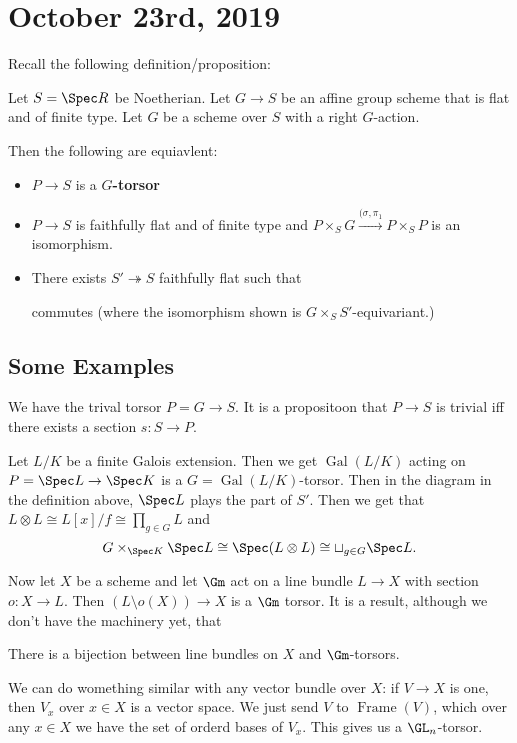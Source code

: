 \documentclass[12pt]{article}
\begin{document}
\section{October 23rd, 2019}
Recall the following definition/proposition:
\begin{defn}
	Let $S=\Spec R$ be Noetherian. Let $G\to S$ be an affine group scheme that is flat and of finite type. Let $G$ be a scheme over $S$ with a right $G$-action.

	Then the following are equiavlent:
	\begin{itemize}
		\item $P\to S$ is a \textbf{$G$-torsor}
		\item $P\to S$ is faithfully flat and of finite type and $P\times_SG\xrightarrow{(\sigma,\pi_1}P\times_S P$ is an isomorphism.
		\item There exists $S'\twoheadrightarrow S$ faithfully flat such that 
		\begin{center}
		\end{center}
		commutes (where the isomorphism shown is $G\times_SS'$-equivariant.)
	\end{itemize}
\end{defn}

\subsection{Some Examples}
We have the trival torsor $P=G\to S$. It is a propositoon that $P\to S$ is trivial iff there exists a section $s:S\to P$.

Let $L/K$ be a finite Galois extension. Then we get $\operatorname{Gal}(L/K)$ acting on $P=\Spec L\to \Spec K$ is a $G=\operatorname{Gal}(L/K)$-torsor.
Then in the diagram in the definition above, $\Spec L$ plays the part of $S'$. Then we get that $L\otimes L\cong L[x]/f\cong \prod_{g\in G}L$ and 
\[G\times_{\Spec K}\Spec L\cong \Spec(L\otimes L)\cong \sqcup_{g\in G}\Spec L.\]

\brk

Now let $X$ be a scheme and let $\Gm$ act on a line bundle $L\to X$ with section $o:X\to L$. Then $(L\setminus o(X))\to X$ is a $\Gm$ torsor.
It is a result, although we don't have the machinery yet, that 
\begin{prop}
	There is a bijection between line bundles on $X$ and $\Gm$-torsors.
\end{prop}
\begin{rmk}
	We can do womething similar with any vector bundle over $X$: if $V\to X$ is one, then $V_x$ over $x\in X$ is a vector space. 
	We just send $V$ to $\operatorname{Frame}(V)$, which over any $x\in X$ we have the set of orderd bases of $V_x$. This gives us a $\GL_n$-torsor.
\end{rmk}
\end{document}
